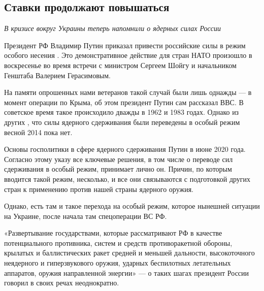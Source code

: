 \subsection{Ставки продолжают повышаться}

\textit{В кризисе вокруг Украины теперь напомнили о ядерных силах России}

Президент РФ Владимир Путин приказал привести российские силы  в режим особого несения . Это демонстративное действие для  стран НАТО произошло в воскресенье во время встречи с министром  Сергеем Шойгу и начальником Генштаба Валерием Герасимовым.

На памяти опрошенных нами ветеранов такой случай были лишь однажды --- в момент операции по  Крыма, об этом президент Путин сам рассказал ВВС. В советское время такое происходило дважды в 1962 и 1983 годах. Однако  из других , что силы ядерного сдерживания были переведены в особый режим весной 2014 пока нет.

Основы госполитики в сфере ядерного сдерживания Путин  в июне 2020 года. Согласно этому указу все ключевые решения, в том числе о переводе сил сдерживания в особый режим, принимает лично он. Причин, по которым вводится такой режим, несколько, и все они связываются с подготовкой других стран к применению против нашей страны ядерного оружия.

Однако, есть там и такое  перехода на особый режим, которое  нынешней ситуации на Украине, после начала там спецоперации ВС РФ.

\begin{fancyquotes}
    «Развертывание государствами, которые рассматривают РФ в качестве потенциального противника, систем и средств противоракетной обороны, крылатых и баллистических ракет средней и меньшей дальности, высокоточного неядерного и гиперзвукового оружия, ударных беспилотных летательных аппаратов, оружия направленной энергии» --- о таких шагах президент России говорил в своих речах неоднократно.
\end{fancyquotes}

